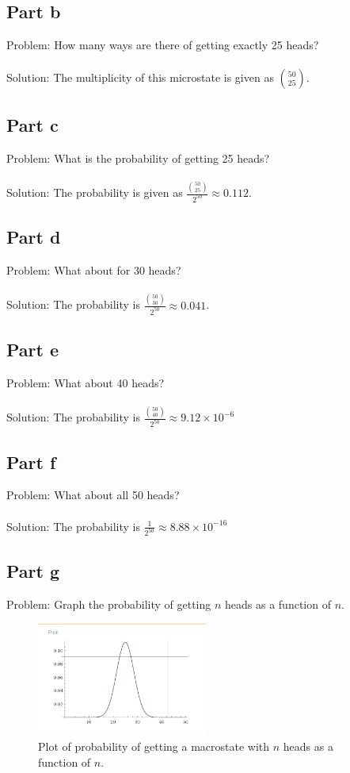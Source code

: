 \documentclass[paper=a4, fontsize=11pt]{scrartcl} %
\numberwithin{equation}{section} %
\numberwithin{figure}{section} %
\numberwithin{table}{section} %
\begin{document}
\subsection*{Part b}
Problem: How many ways are there of getting exactly 25 heads?
\\
\\
Solution: The multiplicity of this microstate is given as $\binom{50}{25}$.

\subsection*{Part c}
Problem: What is the probability of getting 25 heads?
\\
\\
Solution: The probability is given as $\frac{\binom{50}{25}}{2^{50}} \approx 0.112$.

\subsection*{Part d}
Problem: What about for 30 heads?
\\
\\
Solution: The probability is $\frac{\binom{50}{30}}{2^{50}} \approx0.041$.

\subsection*{Part e}
Problem: What about 40 heads?
\\
\\
Solution: The probability is $\frac{\binom{50}{40}}{2^{50}} \approx 9.12\times 10^{-6}$

\subsection*{Part f}
Problem: What about all 50 heads?
\\
\\
Solution: The probability is $\frac{1}{2^{50}} \approx 8.88\times 10^{-16}$

\subsection*{Part g}
Problem: Graph the probability of getting $n$ heads as a function of $n$.
\\
\begin{figure}
\caption{Plot of probability of getting a macrostate with $n$ heads as
a function of $n$.}
\includegraphics[width=0.5\textwidth]{./figures/FiftyCoins.png}
\end{figure}
\end{document}
